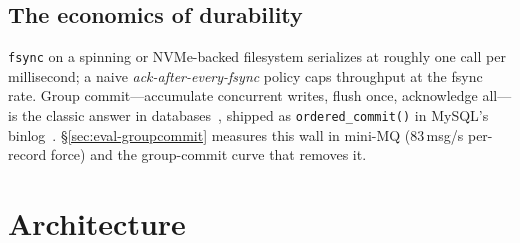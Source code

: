 \documentclass[letterpaper,twocolumn,10pt]{article}
\begin{document}
\subsection{The economics of durability}
\texttt{fsync} on a spinning or NVMe-backed filesystem serializes at
roughly one call per millisecond; a naive \emph{ack-after-every-fsync}
policy caps throughput at the fsync rate. Group commit---accumulate
concurrent writes, flush once, acknowledge all---is the classic answer in
databases~\cite{gray93tp}, shipped as \texttt{ordered\_commit()} in
MySQL's binlog~\cite{mysqlbinlog}. \S\ref{sec:eval-groupcommit} measures
this wall in mini-MQ (83\,msg/s per-record force) and the group-commit
curve that removes it.

\section{Architecture}
\label{sec:arch}
\end{document}
